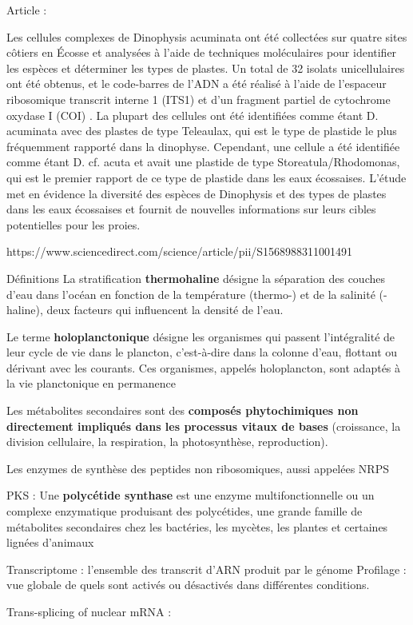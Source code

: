 \documentclass{article}
\begin{document}
Article : \cite{stern2014diversity} 

Les cellules complexes de Dinophysis acuminata ont été collectées sur quatre sites côtiers en Écosse et analysées à l'aide de techniques moléculaires pour identifier les espèces et déterminer les types de plastes.
Un total de 32 isolats unicellulaires ont été obtenus, et le code-barres de l'ADN a été réalisé à l'aide de l'espaceur ribosomique transcrit interne 1 (ITS1) et d'un fragment partiel de cytochrome oxydase I (COI) .
La plupart des cellules ont été identifiées comme étant D. acuminata avec des plastes de type Teleaulax, qui est le type de plastide le plus fréquemment rapporté dans la dinophyse.
Cependant, une cellule a été identifiée comme étant D. cf. acuta et avait une plastide de type Storeatula/Rhodomonas, qui est le premier rapport de ce type de plastide dans les eaux écossaises.
L'étude met en évidence la diversité des espèces de Dinophysis et des types de plastes dans les eaux écossaises et fournit de nouvelles informations sur leurs cibles potentielles pour les proies.

https://www.sciencedirect.com/science/article/pii/S1568988311001491
\printbibliography %

Définitions
La stratification \textbf{thermohaline} désigne la séparation des couches d'eau dans l'océan en fonction de la température (thermo-) et de la salinité (-haline), deux facteurs qui influencent la densité de l'eau.

Le terme \textbf{holoplanctonique} désigne les organismes qui passent l'intégralité de leur cycle de vie dans le plancton, c’est-à-dire dans la colonne d’eau, flottant ou dérivant avec les courants. Ces organismes, appelés holoplancton, sont adaptés à la vie planctonique en permanence

Les métabolites secondaires sont des \textbf{composés phytochimiques non directement impliqués dans les processus vitaux de bases} (croissance, la division cellulaire, la respiration, la photosynthèse, reproduction).

Les enzymes de synthèse des peptides non ribosomiques, aussi appelées NRPS 

PKS : Une \textbf{polycétide synthase} est une enzyme multifonctionnelle ou un complexe enzymatique produisant des polycétides, une grande famille de métabolites secondaires chez les bactéries, les mycètes, les plantes et certaines lignées d'animaux 

Transcriptome : l'ensemble des transcrit d'ARN produit par le génome 
Profilage : vue globale de quels sont activés ou désactivés dans différentes conditions.

Trans-splicing of nuclear mRNA :
\end{document}
